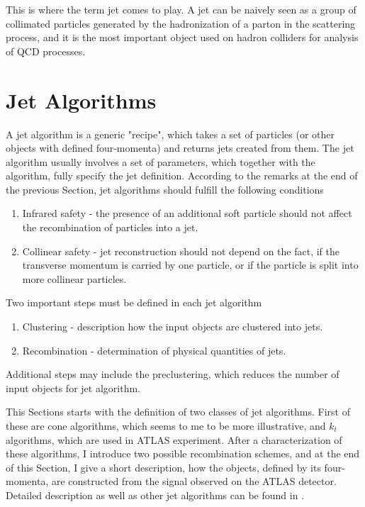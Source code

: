 This is where the term jet comes to play. A jet can be naively seen as a group
of collimated particles generated by the hadronization of a parton in the
scattering process, and it is the most important object used on hadron colliders for
analysis of QCD processes.

\section{Jet Algorithms}

A jet algorithm is a generic "recipe", which takes a set of particles (or other
objects with defined four-momenta) and returns jets created from them. The jet
algorithm usually involves a set of parameters, which together with the
algorithm, fully specify the jet definition. According to the remarks at the end
of the previous Section, jet algorithms should fulfill the following conditions 

\begin{enumerate}
  \item Infrared safety - the presence of an additional soft particle should not
    affect the recombination of particles into a jet.
  \item Collinear safety - jet reconstruction should not depend on the fact, if
    the transverse momentum is carried by one particle, or if the particle is split
    into more collinear particles.
\end{enumerate}
Two important steps must be defined in each jet algorithm

\begin{enumerate}
  \item Clustering - description how the input objects are clustered into jets.
  \item Recombination - determination of physical quantities of jets.
\end{enumerate}
Additional steps may include the preclustering, which reduces the number of input
objects for jet algorithm.

This Sections starts with the definition of two classes of jet algorithms.
First of these are cone algorithms, which seems to me to be more
illustrative, and $k_t$ algorithms, which are used in ATLAS experiment. After
a characterization of these algorithms, I introduce two possible recombination
schemes, and at the end of this Section, I give a short description, how the
objects, defined by its four-momenta, are constructed from the signal
observed on the ATLAS detector. Detailed description as well as other jet
algorithms can be found in \cite{ATLASmain,JetDoporuceniZdenek}.

